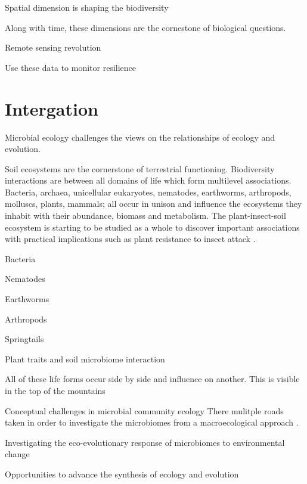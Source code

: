 Spatial dimension is shaping the biodiversity

Along with time, these dimensions are the cornestone of 
biological questions. 


Remote sensing revolution

Use these data to monitor resilience \parencite{Lenton2022resilience}

\section{Intergation}
\label{sec:crete-integration}

Microbial ecology challenges the views on the relationships of ecology and evolution.


Soil ecosystems are the cornerstone of terrestrial functioning.
Biodiversity interactions are between all domains of life which form
multilevel associations. Bacteria, archaea, unicellular eukaryotes, nematodes,
earthworms, arthropods, molluscs, plants, mammals; all occur in unison and 
influence the ecosystems they inhabit with their abundance, biomass \parencite{bar2018biomass} and metabolism.
The plant-insect-soil ecosystem is starting to be studied as a whole to discover
important associations with practical implications such as plant resistance 
to insect attack \parencite{plant-insect-soil2023}.


Bacteria \parencite{Delgado-Baquerizo-atlas}

Nematodes \parencite{vandenHoogen2019}

Earthworms \parencite{Phillips2021}

Arthropods \parencite{milo-arthropods}

Springtails \parencite{potapov2023Globally}

Plant traits and soil microbiome interaction \parencite{beugnon2022Abiotic}

All of these life forms occur side by side and influence on another. This is visible in the 
top of the mountains \parencite{winkler2018side}


Conceptual challenges in microbial community ecology \parencite{prosser2020Conceptual}
There mulitple roads taken in order to investigate the microbiomes from a macroecological
approach \parencite{Mascarenhas2020}.

Investigating the eco-evolutionary response of microbiomes to environmental change \parencite{martiny2023Investigating}

Opportunities to advance the synthesis of ecology and evolution \parencite{loreau2023Opportunities}

